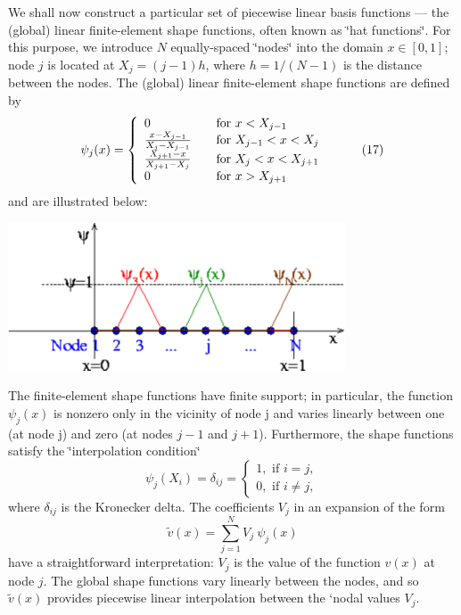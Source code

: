 We shall now construct a particular set of piecewise linear basis functions --- the (global) linear finite-\/element shape functions, often known as \char`\"{}hat functions\char`\"{}. For this purpose, we introduce $N$ equally-\/spaced \char`\"{}nodes\char`\"{} into the domain $ x \in [0,1]$; node $j$ is located at $X_j = (j-1) h $, where $h=1/(N-1)$ is the distance between the nodes. The (global) linear finite-\/element shape functions are defined by \[ \psi_j(x) = \left\{ \begin{array}{ll} 0 & \mbox{\ \ \ for $x < X_{j-1}$} \\ \frac{x-X_{j-1}}{X_j-X_{j-1}} & \mbox{\ \ \ for $ X_{j-1} <x < X_j$} \\ \frac{X_{j+1}-x}{X_{j+1}-X_j} & \mbox{\ \ \ for $ X_{j} <x < X_{j+1}$} \\ 0 & \mbox{\ \ \ for $x > X_{j+1}$} \\ \end{array} \right. \ \ \ \ \ \ \ \ (17) \] and are illustrated below\+:

 
\begin{DoxyImage}
\includegraphics[width=0.75\textwidth]{1Dmesh_with_linear_shape_fcts}
\end{DoxyImage}
 The finite-\/element shape functions have finite support; in particular, the function $ \psi_j(x) $ is nonzero only in the vicinity of node j and varies linearly between one (at node j) and zero (at nodes $ j-1 $ and $ j+1 $). Furthermore, the shape functions satisfy the \char`\"{}interpolation condition\char`\"{} \[ \psi_j(X_i) = \delta_{ij} = \left\{\begin{array}{c} 1, \mbox{ if } i=j,\\ 0, \mbox{ if } i\neq j, \end{array}\right. \] where $ \delta_{ij}$ is the Kronecker delta. The coefficients $V_j$ in an expansion of the form \[ \tilde{v}(x) = \sum_{j=1}^{N} V_j \ \psi_j(x)\] have a straightforward interpretation\+: $V_j$ is the value of the function $ v(x) $ at node $ j $. The global shape functions vary linearly between the nodes, and so $ \tilde{v}(x) $ provides piecewise linear interpolation between the `nodal values\textquotesingle{} $V_j$.

